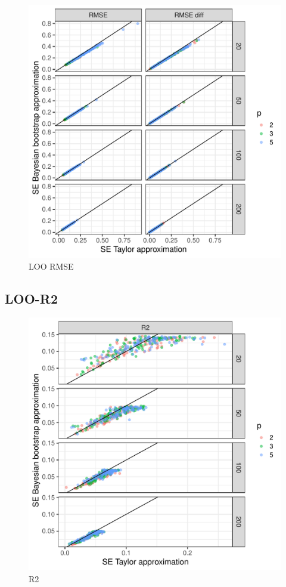 \documentclass{article}
\begin{document}
\begin{figure}[!htb]
    \centering
    \includegraphics[width=\textwidth]{figures/loo_rmse.pdf}
    \caption{LOO RMSE}
    \label{fig:loo-rmse-plot}
\end{figure}


\subsection{LOO-R2}

\begin{figure}[!htb]
    \centering
    \includegraphics[width=\textwidth]{figures/r2.pdf}
    \caption{R2}
    \label{fig:r2-plot}
\end{figure}
\end{document}
